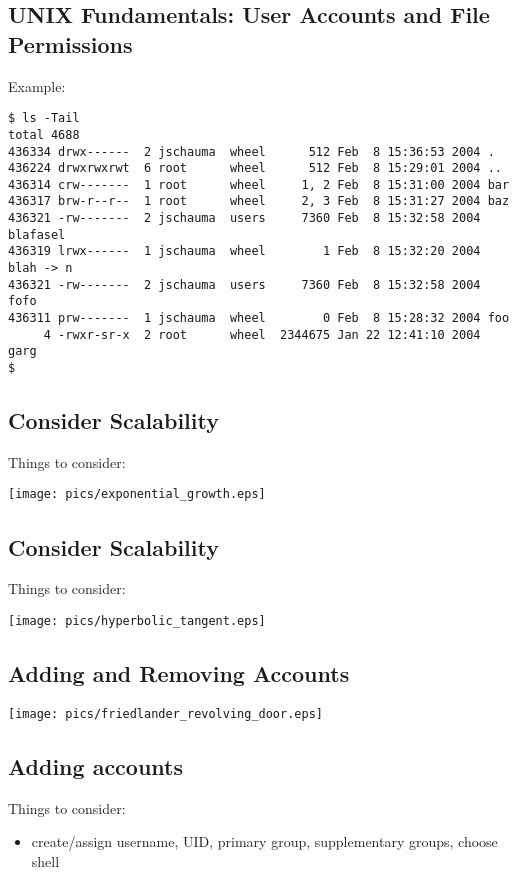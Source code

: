 \documentclass[xga]{xdvislides}
\begin{document}
\subsection{UNIX Fundamentals: User Accounts and File Permissions}
Example:
\begin{verbatim}
$ ls -Tail
total 4688
436334 drwx------  2 jschauma  wheel      512 Feb  8 15:36:53 2004 .
436224 drwxrwxrwt  6 root      wheel      512 Feb  8 15:29:01 2004 ..
436314 crw-------  1 root      wheel     1, 2 Feb  8 15:31:00 2004 bar
436317 brw-r--r--  1 root      wheel     2, 3 Feb  8 15:31:27 2004 baz
436321 -rw-------  2 jschauma  users     7360 Feb  8 15:32:58 2004 blafasel
436319 lrwx------  1 jschauma  wheel        1 Feb  8 15:32:20 2004 blah -> n
436321 -rw-------  2 jschauma  users     7360 Feb  8 15:32:58 2004 fofo
436311 prw-------  1 jschauma  wheel        0 Feb  8 15:28:32 2004 foo
     4 -rwxr-sr-x  2 root      wheel  2344675 Jan 22 12:41:10 2004 garg
$
\end{verbatim}

\subsection{Consider Scalability}
Things to consider:
\\

\begin{center}
	\texttt{[image: pics/exponential\_growth.eps]}
\end{center}

\subsection{Consider Scalability}
Things to consider:
\\

\begin{center}
	\texttt{[image: pics/hyperbolic\_tangent.eps]}
\end{center}

\subsection{Adding and Removing Accounts}
\begin{center}
	\texttt{[image: pics/friedlander\_revolving\_door.eps]}
\end{center}



\subsection{Adding accounts}
Things to consider:
\begin{itemize}
	\item create/assign username, UID, primary group, supplementary groups,
		choose shell
\end{itemize}
\end{document}

